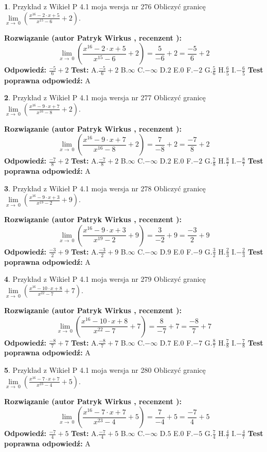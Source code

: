 \documentclass[12pt, a4paper]{article}
\theoremstyle{definition} %
\newtheorem{zad}{}
\newcommand{\zadStart}[1]{\begin{zad}#1\newline}
\newcommand{\zadStop}{\end{zad}}
\newcommand{\rozwStart}[2]{\noindent \textbf{Rozwiązanie (autor #1 , recenzent #2): }\newline}
\newcommand{\rozwStop}{\newline}
\newcommand{\odpStart}{\noindent \textbf{Odpowiedź:}\newline}
\newcommand{\odpStop}{\newline}
\newcommand{\testStart}{\noindent \textbf{Test:}\newline}
\newcommand{\testStop}{\newline}
\newcommand{\kluczStart}{\noindent \textbf{Test poprawna odpowiedź:}\newline}
\newcommand{\kluczStop}{\newline}
\begin{document}
\zadStart{Przykład z Wikieł P 4.1 moja wersja nr 276}
Obliczyć granicę $\lim\limits_{x\to\ 0}(\frac{x^{16}-2 \cdot x +5}{x^{15}-6}+2)$.
\zadStop
\rozwStart{Patryk Wirkus}{}
$$\lim\limits_{x\to\ 0}(\frac{x^{16}-2 \cdot x +5}{x^{15}-6}+2)=\frac{5}{-6}+2=\frac{-5}{6}+2$$
\rozwStop
\odpStart
$\frac{-5}{6}+2$
\odpStop
\testStart
A.$\frac{-5}{6}+2$
B.$\infty$
C.$-\infty$
D.$2$
E.$0$
F.$-2$
G.$\frac{5}{6}$
H.$\frac{6}{5}$
I.$-\frac{6}{5}$
\testStop
\kluczStart
A
\kluczStop



\zadStart{Przykład z Wikieł P 4.1 moja wersja nr 277}
Obliczyć granicę $\lim\limits_{x\to\ 0}(\frac{x^{16}-9 \cdot x +7}{x^{16}-8}+2)$.
\zadStop
\rozwStart{Patryk Wirkus}{}
$$\lim\limits_{x\to\ 0}(\frac{x^{16}-9 \cdot x +7}{x^{16}-8}+2)=\frac{7}{-8}+2=\frac{-7}{8}+2$$
\rozwStop
\odpStart
$\frac{-7}{8}+2$
\odpStop
\testStart
A.$\frac{-7}{8}+2$
B.$\infty$
C.$-\infty$
D.$2$
E.$0$
F.$-2$
G.$\frac{7}{8}$
H.$\frac{8}{7}$
I.$-\frac{8}{7}$
\testStop
\kluczStart
A
\kluczStop



\zadStart{Przykład z Wikieł P 4.1 moja wersja nr 278}
Obliczyć granicę $\lim\limits_{x\to\ 0}(\frac{x^{16}-9 \cdot x +3}{x^{19}-2}+9)$.
\zadStop
\rozwStart{Patryk Wirkus}{}
$$\lim\limits_{x\to\ 0}(\frac{x^{16}-9 \cdot x +3}{x^{19}-2}+9)=\frac{3}{-2}+9=\frac{-3}{2}+9$$
\rozwStop
\odpStart
$\frac{-3}{2}+9$
\odpStop
\testStart
A.$\frac{-3}{2}+9$
B.$\infty$
C.$-\infty$
D.$9$
E.$0$
F.$-9$
G.$\frac{3}{2}$
H.$\frac{2}{3}$
I.$-\frac{2}{3}$
\testStop
\kluczStart
A
\kluczStop



\zadStart{Przykład z Wikieł P 4.1 moja wersja nr 279}
Obliczyć granicę $\lim\limits_{x\to\ 0}(\frac{x^{16}-10 \cdot x +8}{x^{22}-7}+7)$.
\zadStop
\rozwStart{Patryk Wirkus}{}
$$\lim\limits_{x\to\ 0}(\frac{x^{16}-10 \cdot x +8}{x^{22}-7}+7)=\frac{8}{-7}+7=\frac{-8}{7}+7$$
\rozwStop
\odpStart
$\frac{-8}{7}+7$
\odpStop
\testStart
A.$\frac{-8}{7}+7$
B.$\infty$
C.$-\infty$
D.$7$
E.$0$
F.$-7$
G.$\frac{8}{7}$
H.$\frac{7}{8}$
I.$-\frac{7}{8}$
\testStop
\kluczStart
A
\kluczStop



\zadStart{Przykład z Wikieł P 4.1 moja wersja nr 280}
Obliczyć granicę $\lim\limits_{x\to\ 0}(\frac{x^{16}-7 \cdot x +7}{x^{23}-4}+5)$.
\zadStop
\rozwStart{Patryk Wirkus}{}
$$\lim\limits_{x\to\ 0}(\frac{x^{16}-7 \cdot x +7}{x^{23}-4}+5)=\frac{7}{-4}+5=\frac{-7}{4}+5$$
\rozwStop
\odpStart
$\frac{-7}{4}+5$
\odpStop
\testStart
A.$\frac{-7}{4}+5$
B.$\infty$
C.$-\infty$
D.$5$
E.$0$
F.$-5$
G.$\frac{7}{4}$
H.$\frac{4}{7}$
I.$-\frac{4}{7}$
\testStop
\kluczStart
A
\kluczStop
\end{document}
